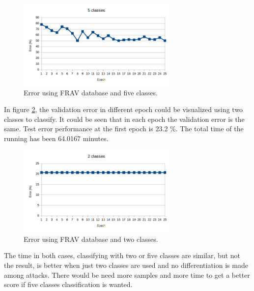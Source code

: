 \begin{figure}[htb]
\centering
\includegraphics[width=0.7\textwidth]{images/epoch_5classes_FRAV_1.png}
\caption{Error using FRAV database and five classes.}
\label{fig:FRAV_five}
\end{figure}

In figure \ref{fig:FRAV_two}, the validation error in different epoch could be visualized using two classes to classify. It could be seen that in each epoch the validation error is the same. Test error performance at the first epoch is 23.2 \%. The total time of the running has been 64.0167 minutes.\\

\begin{figure}[htb]
\centering
\includegraphics[width=0.7\textwidth]{images/epoch_2classes_FRAV_1.png}
\caption{Error using FRAV database and two classes.}
\label{fig:FRAV_two}
\end{figure}

The time in both cases, classifying with two or five classes are similar, but not the result, is better when just two classes are used and no differentiation is made among attacks. There would be need more samples and more time to get a better score if five classes classification is wanted.\\



